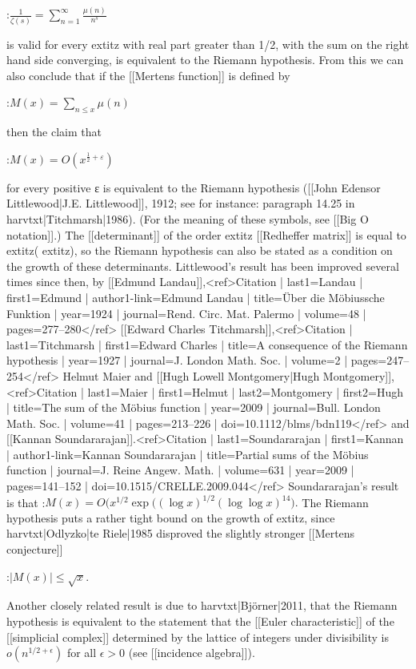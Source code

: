 \documentclass{article}
\begin{document}
:$\frac{1}{\zeta(s)} = \sum_{n=1}^\infty \frac{\mu(n)}{n^s}$

is valid for every 	extit{z} with real part greater than 1/2, with the sum on the right hand side converging, is equivalent to the Riemann hypothesis. From this we can also conclude that if the [[Mertens function]] is defined by

:$M(x) = \sum_{n \le x} \mu(n)$

then the claim that

:$M(x) = O\left(x^{\frac{1}{2}+\varepsilon}\right)$

for every positive ε is equivalent to the Riemann hypothesis ([[John Edensor Littlewood|J.E. Littlewood]], 1912; see for instance: paragraph 14.25 in {{harvtxt|Titchmarsh|1986}}). (For the meaning of these symbols, see [[Big O notation]].) The [[determinant]] of the order 	extit{z} [[Redheffer matrix]] is equal to 	extit{z}(	extit{z}), so the Riemann hypothesis can also be stated as a condition on the growth of these determinants. Littlewood's result has been improved several times since then, by [[Edmund Landau]],<ref>{{Citation | last1=Landau | first1=Edmund | author1-link=Edmund Landau | title=Über die Möbiussche Funktion | year=1924 | journal=Rend. Circ. Mat. Palermo | volume=48 | pages=277–280}}</ref> [[Edward Charles Titchmarsh]],<ref>{{Citation | last1=Titchmarsh | first1=Edward Charles | title=A consequence of the Riemann hypothesis | year=1927 | journal=J. London Math. Soc. | volume=2 | pages=247–254}}</ref> Helmut Maier and [[Hugh Lowell Montgomery|Hugh Montgomery]],<ref>{{Citation | last1=Maier | first1=Helmut | last2=Montgomery | first2=Hugh | title=The sum of the Möbius function | year=2009 | journal=Bull. London Math. Soc. | volume=41 | pages=213–226 | doi=10.1112/blms/bdn119}}</ref> and [[Kannan Soundararajan]].<ref>{{Citation | last1=Soundararajan | first1=Kannan | author1-link=Kannan Soundararajan | title=Partial sums of the Möbius function | journal=J. Reine Angew. Math. | volume=631 | year=2009 | pages=141–152 | doi=10.1515/CRELLE.2009.044}}</ref>  Soundararajan's result is that
:$M(x) = O(x^{1/2}\exp\big((\log x)^{1/2}(\log \log x)^{14}\big).$
The Riemann hypothesis puts a rather tight bound on the growth of 	extit{z}, since {{harvtxt|Odlyzko|te Riele|1985}} disproved the slightly stronger [[Mertens conjecture]]

:$|M(x)| \le \sqrt x.$

Another closely related result is due to {{harvtxt|Björner|2011}}, that the Riemann hypothesis is equivalent to the statement that the [[Euler characteristic]] of the [[simplicial complex]] determined by the lattice of integers under divisibility is $o(n^{1/2+\epsilon})$ for all $\epsilon>0$ (see [[incidence algebra]]).
\end{document}
